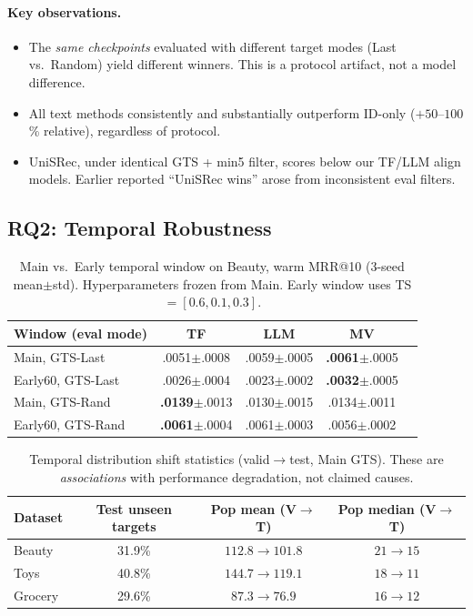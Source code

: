 \documentclass[sigconf,natbib=true,anonymous]{acmart}
\begin{document}
\paragraph{Key observations.}
\begin{itemize}[leftmargin=*,itemsep=1pt]
\item The \emph{same checkpoints} evaluated with different target modes (Last vs.\ Random) yield different winners. This is a protocol artifact, not a model difference.
\item All text methods consistently and substantially outperform ID-only ($+50$--$100$\% relative), regardless of protocol.
\item UniSRec, under identical GTS + min5 filter, scores below our TF/LLM align models. Earlier reported ``UniSRec wins'' arose from inconsistent eval filters.
\end{itemize}

\subsection{RQ2: Temporal Robustness}
\label{sec:rq2}

\begin{table}[t]
\centering
\caption{%
Main vs.\ Early temporal window on Beauty, warm MRR@10 (3-seed mean$\pm$std).
Hyperparameters frozen from Main.  Early window uses TS$=[0.6,0.1,0.3]$.%
}
\label{tab:early}
\small
\begin{tabular}{@{}lcccc@{}}
\toprule
Window (eval mode) & TF & LLM & MV \\
\midrule
Main, GTS-Last    & .0051\tiny{$\pm$.0008} & .0059\tiny{$\pm$.0005} & \textbf{.0061}\tiny{$\pm$.0005} \\
Early60, GTS-Last & .0026\tiny{$\pm$.0004} & .0023\tiny{$\pm$.0002} & \textbf{.0032}\tiny{$\pm$.0005} \\
\midrule
Main, GTS-Rand    & \textbf{.0139}\tiny{$\pm$.0013} & .0130\tiny{$\pm$.0015} & .0134\tiny{$\pm$.0011} \\
Early60, GTS-Rand & \textbf{.0061}\tiny{$\pm$.0004} & .0061\tiny{$\pm$.0003} & .0056\tiny{$\pm$.0002} \\
\bottomrule
\end{tabular}
\end{table}

\begin{table}[t]
\centering
\caption{%
Temporal distribution shift statistics (valid$\to$test, Main GTS).
These are \emph{associations} with performance degradation, not claimed causes.%
}
\label{tab:shift}
\small
\setlength{\tabcolsep}{4pt}
\begin{tabular}{@{}lccc@{}}
\toprule
Dataset & Test unseen targets & Pop mean (V$\to$T) & Pop median (V$\to$T) \\
\midrule
Beauty & 31.9\% & $112.8 \to 101.8$ & $21 \to 15$ \\
Toys   & 40.8\% & $144.7 \to 119.1$ & $18 \to 11$ \\
Grocery & 29.6\% & $87.3 \to 76.9$ & $16 \to 12$ \\
\bottomrule
\end{tabular}
\end{table}
\end{document}
